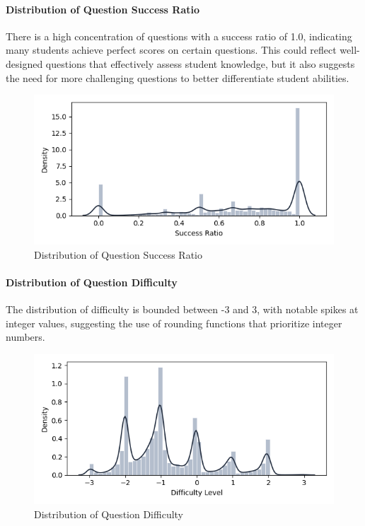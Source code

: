 \documentclass[
    a4paper, %
    10pt, %
    twoside, %
]{LTJournalArticle}
\begin{document}
\paragraph{Distribution of Question Success Ratio}
There is a high concentration of questions with a success ratio of 1.0, indicating many students achieve perfect scores on certain questions. This could reflect well-designed questions that effectively assess student knowledge, but it also suggests the need for more challenging questions to better differentiate student abilities.

\begin{figure}[H]
    \centering
    \includegraphics[width=\columnwidth]{images/success_ratio_distribution.png}
    \caption{Distribution of Question Success Ratio}
    \label{fig:success-ratio-dist}
\end{figure}

\paragraph{Distribution of Question Difficulty}
The distribution of difficulty is bounded between -3 and 3, with notable spikes at integer values, suggesting the use of rounding functions that prioritize integer numbers. 

\begin{figure}[H]
    \centering
    \includegraphics[width=\columnwidth]{images/difficulty_distribution.png}
    \caption{Distribution of Question Difficulty}
    \label{fig:difficulty-dist}
\end{figure}
\end{document}
